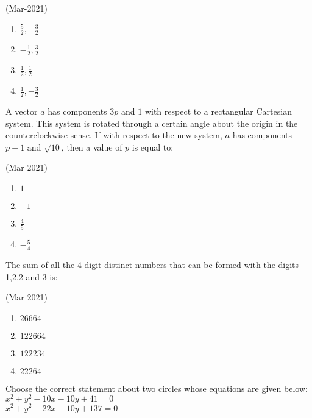 					\hfill{(Mar-2021)}
					\begin{multicols}{4}
                \begin{enumerate}
    \item $ \frac{5}{2}, -\frac{3}{2} $
    \item $ -\frac{1}{2}, \frac{3}{2} $
    \item $ \frac{1}{2}, \frac{1}{2} $
    \item $ \frac{1}{2}, -\frac{3}{2} $
                \end{enumerate}
					\end{multicols}
	\item
		A vector $a$ has components $3p$ and $1$ with respect to a rectangular Cartesian system. This system is rotated through a certain angle about the origin in the counterclockwise sense. If with respect to the new system, $a$ has components $p+1$ and $\sqrt{10}$, then a value of $p$ is equal to:

			\hfill{(Mar 2021)}
			\begin{multicols}{4}
		\begin{enumerate}
    \item $ 1 $
    \item $ -1 $
    \item $ \frac{4}{5} $
    \item $ -\frac{5}{4} $
                \end{enumerate}
			\end{multicols}
	\item
		The sum of all the 4-digit distinct numbers that can be formed with the digits 1,2,2 and 3 is:

			\hfill{(Mar 2021)}
			\begin{multicols}{2}
		\begin{enumerate}
    \item $ 26664 $
    \item $ 122664 $
    \item $ 122234 $
    \item $ 22264 $
                \end{enumerate}
			\end{multicols}
	\item
                Choose the correct statement about two circles whose equations are given below:\\
$ x^2 + y^2 - 10x - 10y + 41 = 0 $\\
$ x^2 + y^2 - 22x - 10y + 137 = 0 $\\

